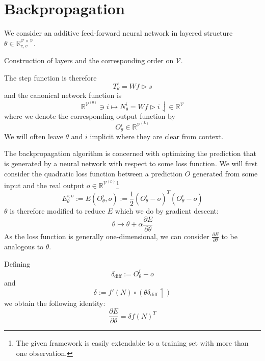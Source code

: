 \documentclass[a4paper,11pt]{article}
\begin{document}
\section{Backpropagation}
\begin{Abs}
We consider an additive feed-forward neural network in layered structure $\theta\in\mathbb{R}_{c,v}^{\mathcal{V}\times\mathcal{V}}$.
\begin{OP}
Construction of layers and the corresponding order on $\mathcal{V}$.
\end{OP}
The step function is therefore
\begin{equation}
T_{\theta}^s=Wf\vartriangleright s
\end{equation}
and the canonical network function is
\begin{equation}
\mathbb{R}^{\mathcal{V}^{(0)}}\ni i\mapsto N_{\theta}^i=Wf\vartriangleright i\downharpoonleft\in\mathbb{R}^{\mathcal{V}}
\end{equation}
where we denote the corresponding output function by
\begin{equation}
O_{\theta}^i\in\mathbb{R}^{\mathcal{V}^{(L)}}
\end{equation}
We will often leave $\theta$ and $i$ implicit where they are clear from context.
\end{Abs}
\begin{Abs}
The backpropagation algorithm is concerned with optimizing the prediction that is generated by a neural network with respect to some loss function. We will first consider the quadratic loss function between a prediction $O$ generated from some input and the real output $o\in\mathbb{R}^{\mathcal{V}^{(L)}}$\footnote{
The given framework is easily extendable to a training set with more than one observation.}
\begin{equation}
E_{\theta}^{i;o}:=E(O_{\theta}^i,o):=\frac12(O_{\theta}^i-o)^T(O_{\theta}^i-o)
\end{equation}
$\theta$ is therefore modified to reduce $E$ which we do by gradient descent:
\begin{equation}
\theta\mapsto\theta+\alpha\frac{\partial E}{\partial\theta}
\end{equation}
As the loss function is generally one-dimensional, we can consider $\frac{\partial E}{\partial \theta}$ to be analogous to $\theta$.
\end{Abs}
\begin{The}\label{backprop-the}
Defining
\begin{equation}\label{deltadiff}
\delta_{\text{diff}}:=O_{\theta}^i-o
\end{equation}
and
\begin{equation}\label{delta}
\delta:=f'(N)\circ\left(\theta\delta_{\text{diff}}\upharpoonleft\right)
\end{equation}
we obtain the following identity:
\begin{equation}\label{backprop-identity}
\frac{\partial E}{\partial \theta}=\delta f(N)^T
\end{equation}
\end{The}
\end{document}
